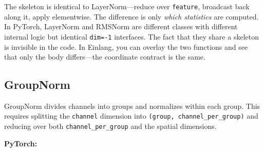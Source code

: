 \documentclass[11pt,titlepage]{article}
\begin{document}
The skeleton is identical to LayerNorm---reduce over \texttt{feature},
broadcast back along it, apply elementwise. The difference is only
\emph{which statistics} are computed. In PyTorch, LayerNorm and RMSNorm
are different classes with different internal logic but identical
\texttt{dim=-1} interfaces. The fact that they share a skeleton is
invisible in the code. In Einlang, you can overlay the two functions and
see that only the body differs---the coordinate contract is the same.

\vspace{2em}

\hypertarget{groupnorm}{%
\subsection{GroupNorm}\label{groupnorm}}

GroupNorm divides channels into groups and normalizes within each group.
This requires splitting the \texttt{channel} dimension into
\texttt{(group,\ channel\_per\_group)} and reducing over both
\texttt{channel\_per\_group} and the spatial dimensions.

\textbf{PyTorch:}
\end{document}
